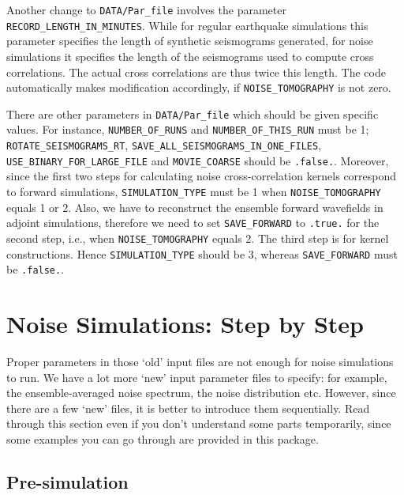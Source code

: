 Another change to \texttt{DATA/Par\_file} involves the parameter \texttt{RECORD\_LENGTH\_IN\_MINUTES}.
While for regular earthquake simulations this parameter specifies the length of synthetic seismograms generated,
for noise simulations it specifies the length of the seismograms used to compute cross correlations.
The actual cross correlations are thus twice this length.
The code automatically makes modification accordingly, if \texttt{NOISE\_TOMOGRAPHY} is not zero.\newline


There are other parameters in \texttt{DATA/Par\_file} which should be given specific values.
For instance, \texttt{NUMBER\_OF\_RUNS} and \texttt{NUMBER\_OF\_THIS\_RUN} must be 1;
\texttt{ROTATE\_SEISMOGRAMS\_RT}, \texttt{SAVE\_ALL\_SEISMOGRAMS\_IN\_ONE\_FILES},
\texttt{USE\_BINARY\_FOR\_LARGE\_FILE} and \texttt{MOVIE\_COARSE} should be \texttt{.false.}.
Moreover, since the first two steps for calculating noise cross-correlation kernels correspond to
forward simulations, \texttt{SIMULATION\_TYPE} must be 1 when \texttt{NOISE\_TOMOGRAPHY} equals 1 or 2.
Also, we have to reconstruct the ensemble forward wavefields in adjoint simulations,
therefore we need to set \texttt{SAVE\_FORWARD} to \texttt{.true.} for the second step,
i.e., when \texttt{NOISE\_TOMOGRAPHY} equals 2.
The third step is for kernel constructions. Hence \texttt{SIMULATION\_TYPE} should be 3, whereas
\texttt{SAVE\_FORWARD} must be \texttt{.false.}.\newline


\section{Noise Simulations: Step by Step}

Proper parameters in those `old' input files are not enough for noise simulations to run.
We have a lot more `new' input parameter files to specify:
for example, the ensemble-averaged noise spectrum, the noise distribution etc.
However, since there are a few `new' files, it is better to introduce them sequentially.
Read through this section even if you don't understand some parts temporarily,
since some examples you can go through are provided in this package.

\subsection{Pre-simulation}

